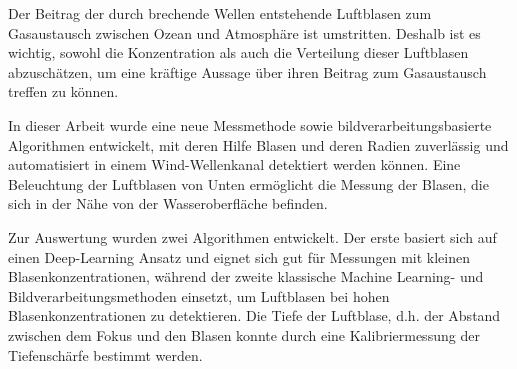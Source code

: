 Der Beitrag der durch brechende Wellen entstehende Luftblasen zum Gasaustausch zwischen Ozean und Atmosph\"are ist umstritten. Deshalb ist es wichtig, sowohl die Konzentration als auch die Verteilung dieser Luftblasen abzusch\"atzen, um eine kr\"aftige Aussage über ihren Beitrag zum Gasaustausch treffen zu k\"onnen. 

In dieser Arbeit wurde eine neue Messmethode sowie bildverarbeitungsbasierte Algorithmen entwickelt, mit deren Hilfe Blasen und deren Radien zuverlässig und automatisiert in einem Wind-Wellenkanal detektiert werden k\"onnen. Eine Beleuchtung der Luftblasen von Unten erm\"oglicht die Messung der Blasen, die sich in der Nähe von der Wasseroberfläche befinden. 

Zur Auswertung wurden zwei Algorithmen entwickelt. Der erste basiert sich auf einen Deep-Learning Ansatz und eignet sich gut f\"ur Messungen mit kleinen Blasenkonzentrationen, während der zweite klassische Machine Learning- und Bildverarbeitungsmethoden einsetzt, um Luftblasen bei hohen Blasenkonzentrationen zu detektieren. Die Tiefe der Luftblase, d.h. der Abstand zwischen dem Fokus und den Blasen konnte durch eine Kalibriermessung der Tiefensch\"arfe bestimmt werden.  